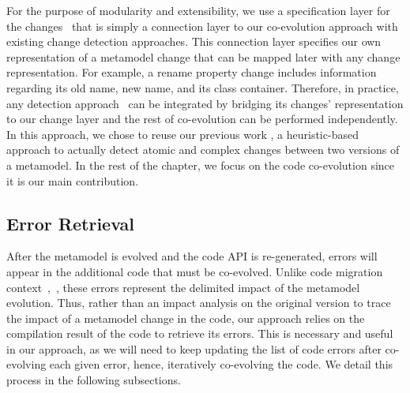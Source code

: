 For the purpose of modularity and extensibility, we use a specification layer for the changes~{\small{}} that is simply a connection layer to our co-evolution approach with existing change detection approaches. This connection layer specifies our own representation of a metamodel change that can be mapped later with any change representation.  
For example, a rename property change includes information regarding its old name, new name, and its class container. Therefore, in practice, any detection approach~\cite{Alter2015, williams2012searching,cicchetti_managing_2009,langer_posteriori_2013,vermolen_reconstructing_2012,Khelladi2016,bettini2022executable} can be integrated by bridging its changes' representation to our change layer and the rest of co-evolution can be performed independently.
In this approach, we chose to reuse our previous work \cite{Khelladi2016}, a heuristic-based approach to actually detect atomic and complex changes between two versions of a metamodel.
In the rest of the chapter, we focus on the code co-evolution since it is our main contribution. 

\subsection{Error Retrieval}
\label{errorretrieving}

After the metamodel is evolved and the code API is re-generated, errors will appear in the additional code that must be co-evolved. Unlike code migration context~\cite{9079197},~\cite{henkel2005catchup}, these errors represent the delimited impact of the metamodel evolution. Thus, rather than an impact analysis on the original version to trace the impact of a metamodel change in the code, our approach relies on the compilation result of the code to retrieve its errors. 
This is necessary and useful in our approach, as we will need to keep updating the list of code errors after co-evolving each given error, hence, iteratively co-evolving the code. We detail this process in the following subsections.

